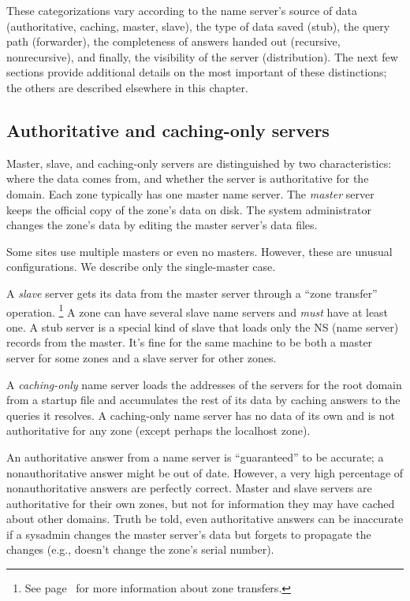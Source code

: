 These categorizations vary according to the name server's source of data
(authoritative, caching, master, slave), the type of data saved (stub),
the query path (forwarder), the completeness of answers handed out
(recursive, nonrecursive), and finally, the visibility of the server
(distribution). The next few sections provide additional details on the
most important of these distinctions; the others are described elsewhere in this chapter.


\subsection{Authoritative and caching-only servers}

Master, slave, and caching-only servers are distinguished by two characteristics: where the data comes from, and whether the server is authoritative for the domain.
Each zone typically has one master name server.
The \emph{master} server
keeps the official copy of the zone's data on disk.
The system administrator changes the zone's data by editing the master server's data files.

Some sites use multiple masters or even no masters.
However, these are unusual configurations.
We describe only the single-master case.

A \emph{slave} server
gets its data from the master server through a ``zone transfer'' operation.%
   \footnote{See page~\pageref{sec:zone-transfers} for more information about zone transfers.}
A zone can have several slave name servers and \emph{must} have at least one.
A stub server is a special kind of slave that loads only the NS (name server) records from the master.
It's fine for the same machine to be both a master server for some zones and a slave server for other zones.

A \emph{caching-only}
name server loads the addresses of the servers for the root domain from a startup file and accumulates the rest of its data by caching answers to the queries it resolves.
A caching-only name server has no data of its own and is not authoritative for any zone (except perhaps the localhost zone).

An authoritative answer from a name server is ``guaranteed'' to be accurate; a nonauthoritative answer might be out of date.
However, a very high percentage of nonauthoritative answers are perfectly correct.
Master and slave servers are authoritative for their own zones, but not for information they may have cached about other domains.
Truth be told, even authoritative answers can be inaccurate if a sysadmin changes the master server's data but forgets to propagate the changes
(e.g., doesn't change the zone's serial number).

